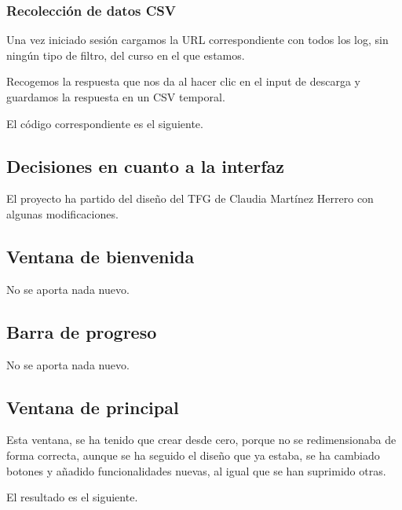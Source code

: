 
\subsubsection{Recolección de datos CSV}\label{responsive-web}

Una vez iniciado sesión cargamos la URL correspondiente con todos los log, sin ningún tipo de filtro, del curso en el que estamos.

Recogemos la respuesta que nos da al hacer clic en el input de descarga y guardamos la respuesta en un CSV temporal.

El código correspondiente es el siguiente.



\subsection{Decisiones en cuanto a la interfaz}\label{decisiones-en-cuanto-a-la-interfaz}

El proyecto ha partido del diseño del TFG de Claudia Martínez Herrero \cite{claudia} con algunas modificaciones.

\subsection{Ventana de bienvenida}\label{ventana-de-bienvenida}

No se aporta nada nuevo.

\subsection{Barra de progreso}\label{barra-de-progreso}

No se aporta nada nuevo.

\subsection{Ventana de principal}\label{ventana-de-principal}

Esta ventana, se ha tenido que crear desde cero, porque no se redimensionaba de forma correcta, aunque se ha seguido el diseño que ya estaba, se ha cambiado botones y añadido funcionalidades nuevas, al igual que se han suprimido otras. 

El resultado es el siguiente.


